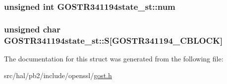 \subsubsection[{\texorpdfstring{num}{num}}]{\setlength{\rightskip}{0pt plus 5cm}unsigned int G\+O\+S\+T\+R341194state\+\_\+st\+::num}\hypertarget{struct_g_o_s_t_r341194state__st_a220d369a14a4761264ca4ea112f7786c}{}\label{struct_g_o_s_t_r341194state__st_a220d369a14a4761264ca4ea112f7786c}
\subsubsection[{\texorpdfstring{S}{S}}]{\setlength{\rightskip}{0pt plus 5cm}unsigned char G\+O\+S\+T\+R341194state\+\_\+st\+::S\mbox{[}{\bf G\+O\+S\+T\+R341194\+\_\+\+C\+B\+L\+O\+CK}\mbox{]}}\hypertarget{struct_g_o_s_t_r341194state__st_a10d2c1e5b4d530eb80254a8d28cb99ff}{}\label{struct_g_o_s_t_r341194state__st_a10d2c1e5b4d530eb80254a8d28cb99ff}


The documentation for this struct was generated from the following file\+:\begin{DoxyCompactItemize}
\item 
src/hal/pb2/include/openssl/\hyperlink{gost_8h}{gost.\+h}\end{DoxyCompactItemize}
